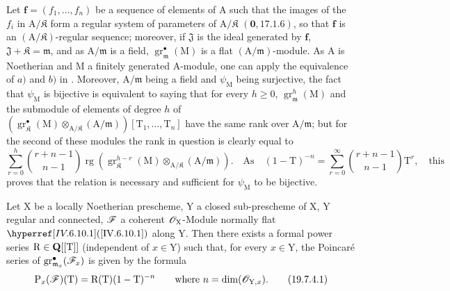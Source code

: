 Let $\mathbf{f}=(f_1,\ldots,f_n)$ be a sequence of elements of $\mathrm{A}$ such that the images of the $f_i$ in $\mathrm{A}/\mathfrak K$ form a regular system of parameters of $\mathrm{A}/\mathfrak K$ $(\mathbf{0},17.1.6)$, so that $\mathbf{f}$ is an $(\mathrm{A}/\mathfrak K)$-regular sequence; moreover, if $\mathfrak{J}$ is the ideal generated by $\mathbf{f}$, $\mathfrak{J}+\mathfrak K=\mathfrak{m}$, and as $\mathrm{A}/\mathfrak{m}$ is a field, $\operatorname{gr}_\mathfrak{m}^\bullet(\mathrm{M})$ is a flat $(\mathrm{A}/\mathfrak{m})$-module. As $\mathrm{A}$ is Noetherian and $\mathrm{M}$ a finitely generated $\mathrm{A}$-module, one can apply the equivalence of $a)$ and $b)$ in . Moreover, $\mathrm{A}/\mathfrak{m}$ being a field and $\psi_\mathrm{M}$ being surjective, the fact that $\psi_\mathrm{M}$ is bijective is equivalent to saying that for every $h\geqslant 0$, $\operatorname{gr}_\mathfrak{m}^h(\mathrm{M})$ and the submodule of elements of degree $h$ of $(\operatorname{gr}_\mathfrak K^\bullet(\mathrm{M})\otimes_{\mathrm{A}/\mathfrak K}(\mathrm{A}/\mathfrak{m}))[\mathrm{T}_1,\ldots,\mathrm{T}_n]$ have the same rank over $\mathrm{A}/\mathfrak{m}$; but for the second of these modules the rank in question is clearly equal to
\[
  \textstyle\sum_{r=0}^{h}\binom{r+n-1}{n-1}\operatorname{rg}(\operatorname{gr}_\mathfrak K^{h-r}(\mathrm{M})\otimes_{\mathrm{A}/\mathfrak K}(\mathrm{A}/\mathfrak{m})).\quad\text{As}\quad(1-\mathrm{T})^{-n}=\textstyle\sum_{r=0}^{\infty}\binom{r+n-1}{n-1}\mathrm{T}^r,\quad\text{this}
\]
proves that the relation  is necessary and sufficient for $\psi_\mathrm{M}$ to be bijective.

\begin{corollary}[19.7.4]
\label{IV.19.7.4}
Let $\mathrm{X}$ be a locally Noetherian prescheme, $\mathrm{Y}$ a closed sub-prescheme of $\mathrm{X}$, $\mathrm{Y}$ regular and connected, $\mathscr{F}$ a coherent $\mathscr{O}_\mathrm{X}$-Module normally flat $\sref{IV.6.10.1}$ along $\mathrm{Y}$. Then there exists a formal power series $\mathrm{R}\in\mathbf{Q}[[\mathrm{T}]]$ \textup{(independent of $x\in\mathrm{Y}$)} such that, for every $x\in\mathrm{Y}$, the Poincar\'e series of $\operatorname{gr}_{\mathfrak{m}_x}^\bullet(\mathscr{F}_x)$ is given by the formula
\begin{equation}
  \mathrm{P}_x(\mathscr{F})(\mathrm{T})=\mathrm{R}(\mathrm{T})(1-\mathrm{T})^{-n}\qquad\text{where }n=\dim(\mathscr{O}_{\mathrm{Y},x}).
  \label{IV.19.7.4.1}
\tag{19.7.4.1}
\end{equation}
\end{corollary}

